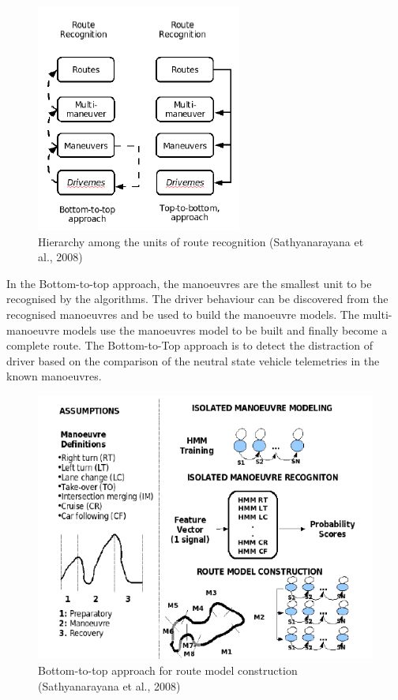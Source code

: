 \begin{figure}[hbt!]\centering
\includegraphics[width=.75\textwidth]{image/HMM_flowchart}
\caption{Hierarchy among the units of route recognition (Sathyanarayana et al., 2008)}
\end{figure}

In the Bottom-to-top approach, the manoeuvres are the smallest unit to be recognised by the algorithms. The driver behaviour can be discovered from the recognised manoeuvres and be used to build the manoeuvre models. The multi-manoeuvre models use the manoeuvres model to be built and finally become a complete route. The Bottom-to-Top approach is to detect the distraction of driver based on the comparison of the neutral state vehicle telemetries in the known manoeuvres.

\begin{figure}[hbt!]\centering
\includegraphics[width=.75\textwidth]{image/BottomtoTop}
\caption{Bottom-to-top approach for route model construction (Sathyanarayana et al., 2008)}
\end{figure}

